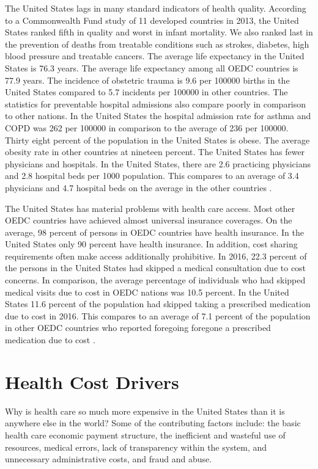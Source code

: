 \documentclass[sigconf]{acmart}
\begin{document}
The United States lags in many standard indicators of health quality.  According to a Commonwealth Fund study of 11 developed countries in 2013, the United States ranked fifth in quality and worst in infant mortality. We also ranked last in the prevention of deaths from treatable conditions such as strokes, diabetes, high blood pressure and treatable cancers.  The average life expectancy in the United States is 76.3 years.  The average life expectancy among all OEDC countries is 77.9 years.  The incidence of obstetric trauma is 9.6 per 100000 births in the United States compared to 5.7 incidents per 100000 in other countries. The statistics for preventable hospital admissions also compare poorly in comparison to other nations. In the United States the hospital admission rate for asthma and COPD was 262 per 100000 in comparison to the average of 236 per 100000. Thirty eight percent of the population in the United States is obese. The average obesity rate in other countries at nineteen percent.  The United States has fewer physicians and hospitals.  In the United States, there are 2.6 practicing physicians and 2.8 hospital beds per 1000 population. This compares to an average of 3.4 physicians and 4.7 hospital beds on the average in the other countries \cite{OEDC}. 

The United States has material problems with health care access.  Most other OEDC countries have achieved almost universal insurance coverages. On the average, 98 percent of persons in OEDC countries have health insurance. In the United States only 90 percent have health insurance.  In addition, cost sharing requirements often make access additionally prohibitive.   In 2016, 22.3 percent of the persons in the United States had skipped a medical consultation due to cost concerns. In comparison, the average percentage of individuals who had skipped medical visits due to cost in OEDC nations was 10.5 percent.  In the United States 11.6 percent of the population had skipped taking a prescribed medication due to cost in 2016. This compares to an average of 7.1 percent of the population in other OEDC countries who reported foregoing foregone a prescribed medication due to cost \cite{OEDC}.


\section{Health Cost Drivers}
Why is health care so much more expensive in the United States than it is anywhere else in the world?  Some of the contributing factors include: the basic health care economic payment structure, the inefficient and wasteful use of resources, medical errors, lack of transparency within the system, and unnecessary administrative costs, and fraud and abuse.
\end{document}

